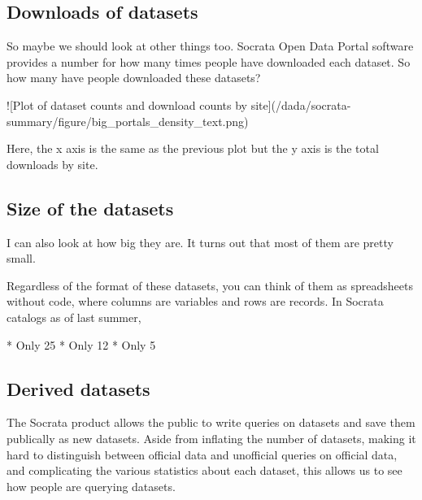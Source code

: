 \documentclass{acm_proc_article-sp}
\begin{document}
\subsection{Downloads of datasets}
So maybe we should look at other things too.
Socrata Open Data Portal software provides a number for
how many times people have downloaded each dataset.
So how many have people downloaded these datasets?

![Plot of dataset counts and download counts by site](/dada/socrata-summary/figure/big_portals_density_text.png)

Here, the x axis is the same as the previous plot but the y axis is the total
downloads by site.

\subsection{Size of the datasets}
I can also look at how big they are.
It turns out that most of them are pretty small.


Regardless of the format of these datasets, you can think of them as
spreadsheets without code, where columns are variables and rows are records.
In Socrata catalogs as of last summer,

* Only 25%
* Only 12%
* Only 5%



\subsection{Derived datasets}
The Socrata product allows the public to write queries on datasets and
save them publically as new datasets. Aside from inflating the number
of datasets, making it hard to distinguish between official data and
unofficial queries on official data, and complicating the various
statistics about each dataset, this allows us to see how people are
querying datasets.
\end{document}
